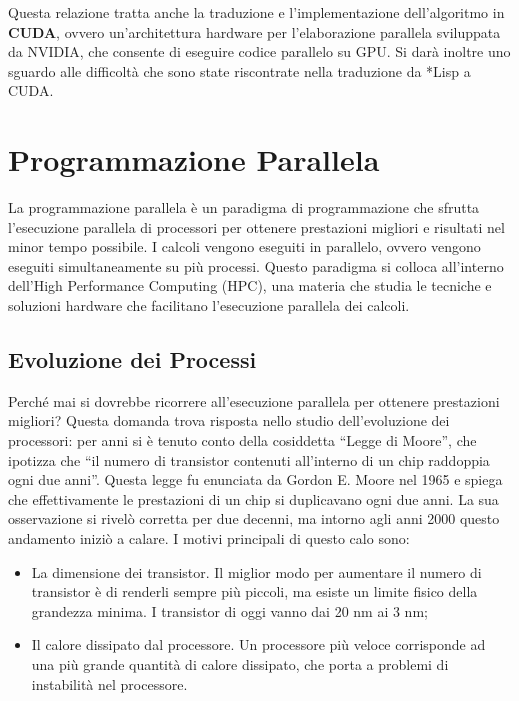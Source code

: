 \documentclass[12pt,a4paper,openright,twoside]{report}
\begin{document}
Questa relazione tratta anche la traduzione e l'implementazione dell'algoritmo in \textbf{CUDA}, ovvero un'architettura hardware per l'elaborazione parallela sviluppata da NVIDIA, che consente di eseguire codice parallelo su GPU. Si darà inoltre uno sguardo alle difficoltà che sono state riscontrate nella traduzione da *Lisp a CUDA.



\rhead[\fancyplain{}{\bfseries\leftmark}]{\fancyplain{}{\bfseries\thepage}}
\clearpage{\pagestyle{empty}\cleardoublepage}
\clearpage{\pagestyle{empty}\cleardoublepage}
\chapter{Programmazione Parallela}

\lhead[\fancyplain{}{\bfseries\thepage}]{\fancyplain{}{\bfseries\rightmark}}

La programmazione parallela è un paradigma di programmazione che sfrutta l'esecuzione parallela di processori per ottenere prestazioni migliori e risultati nel minor tempo possibile. I calcoli vengono eseguiti in parallelo, ovvero vengono eseguiti simultaneamente su più processi. Questo paradigma si colloca all'interno dell'High Performance Computing (HPC), una materia che studia le tecniche e soluzioni hardware che facilitano l'esecuzione parallela dei calcoli.



\section{Evoluzione dei Processi}

Perché mai si dovrebbe ricorrere all'esecuzione parallela per ottenere prestazioni migliori? Questa domanda trova risposta nello studio dell'evoluzione dei processori: per anni si è tenuto conto della cosiddetta ``Legge di Moore'', che ipotizza che ``il numero di transistor contenuti all'interno di un chip raddoppia ogni due anni''. Questa legge fu enunciata da Gordon E. Moore nel 1965 e spiega che effettivamente le prestazioni di un chip si duplicavano ogni due anni. La sua osservazione si rivelò corretta per due decenni, ma intorno agli anni 2000 questo andamento iniziò a calare. I motivi principali di questo calo sono:

\begin{itemize}
    \item La dimensione dei transistor. Il miglior modo per aumentare il numero di transistor è di renderli sempre più piccoli, ma esiste un limite fisico della grandezza minima. I transistor di oggi vanno dai 20 nm ai 3 nm;
    \item Il calore dissipato dal processore. Un processore più veloce corrisponde ad una più grande quantità di calore dissipato, che porta a problemi di instabilità nel processore.
\end{itemize}
\end{document}
